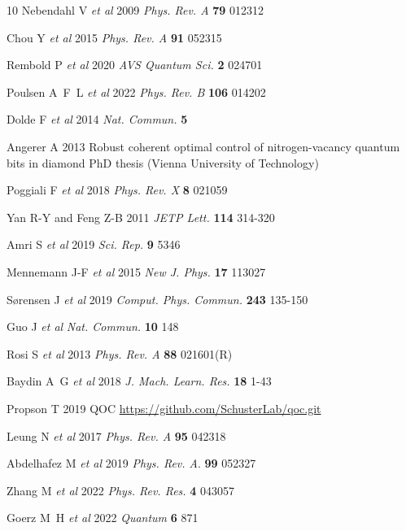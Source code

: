 \documentclass[letterpaper,10pt]{iopart}
\begin{document}
\begin{thebibliography}{10}
Nebendahl V {\em et al\/}  
2009
{\em Phys. Rev. A}
{\bf79} 012312  

Chou Y {\em et al\/}
2015
{\em Phys. Rev. A}
{\bf91} 052315  

Rembold P {\em et al\/}
2020
{\em AVS Quantum Sci.}
{\bf2} 024701 

Poulsen A~F~L {\em et al\/}
2022
{\em Phys. Rev. B}
\textbf{106} 014202  

Dolde F {\em et al\/}
2014
{\em Nat. Commun.}
{\bf5} 

Angerer A
2013
Robust coherent optimal control of nitrogen-vacancy quantum bits in diamond
PhD thesis (Vienna University of Technology)

Poggiali F {\em et al\/}
2018
{\em Phys. Rev. X}
{\bf8} 021059 

Yan R-Y and Feng Z-B
2011
{\em JETP Lett.}
{\bf114} 314-320 

Amri S {\em et al\/}
2019
{\em Sci. Rep.}
{\bf9} 5346 

Mennemann J-F {\em et al\/}
2015
{\em New J. Phys.}
{\bf17} 113027

Sørensen J {\em et al\/}
2019
{\em Comput. Phys. Commun.}
{\bf243} 135-150 

Guo J {\em et al\/}
{\em Nat. Commun.}
{\bf10} 148 

Rosi S {\em et al\/}
2013
{\em Phys. Rev. A}
{\bf88} 021601(R) 

Baydin A~G {\em et al\/} 
2018
{\em J. Mach. Learn. Res.}
{\bf18} 1-43 

Propson T
2019
QOC
\url{https://github.com/SchusterLab/qoc.git} 

Leung N {\em et al\/} 
2017
{\em Phys. Rev. A}
{\bf95} 042318 

Abdelhafez M {\em et al\/} 
2019
{\em Phys. Rev. A}.
{\bf99} 052327 

Zhang M {\em et al\/} 
2022
{\em Phys. Rev. Res.}
{\bf4} 043057 

Goerz M~H {\em et al\/}
2022
{\em Quantum}
{\bf6}  871 


\end{thebibliography}
\end{document}
